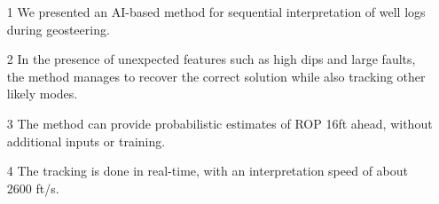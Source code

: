 
\begin{itemize}
\compresslist
	\item[1] We presented an AI-based method for sequential interpretation of well logs during geosteering.
	\item[2] In the presence of unexpected features such as high dips and large faults, the method manages to recover the correct
solution while also tracking other likely modes.
	\item[3] The method can provide probabilistic estimates of ROP 16ft ahead, without additional inputs or training.
	\item[4] The tracking is done in real-time, with an interpretation speed of about 2600 ft/s.
\end{itemize}
